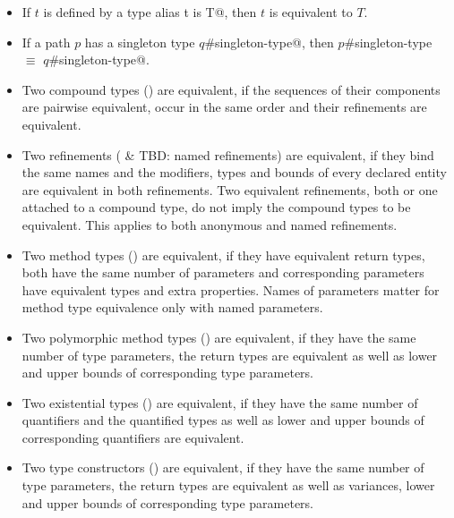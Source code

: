\begin{itemize}
\item
If $t$ is defined by a type alias \lstinline@type t is T@, then $t$ is equivalent to $T$. 

\item
If a path $p$ has a singleton type \lstinline@$q$#singleton-type@, then \lstinline@$p$#singleton-type $\equiv$ $q$#singleton-type@. 

\item
Two compound types () are equivalent, if the sequences of their components are pairwise equivalent, occur in the same order and their refinements are equivalent.

\item 
Two refinements ( \& TBD: named refinements) are equivalent, if they bind the same names and the modifiers, types and bounds of every declared entity are equivalent in both refinements. Two equivalent refinements, both or one attached to a compound type, do not imply the compound types to be equivalent. This applies to both anonymous and named refinements. 

\item
Two method types () are equivalent, if they have equivalent return types, both have the same number of parameters and corresponding parameters have equivalent types and extra properties. Names of parameters matter for method type equivalence only with named parameters. 

\item
Two polymorphic method types () are equivalent, if they have the same number of type parameters, the return types are equivalent as well as lower and upper bounds of corresponding type parameters. 

\item
Two existential types () are equivalent, if they have the same number of quantifiers and the quantified types as well as lower and upper bounds of corresponding quantifiers are equivalent. 

\item
Two type constructors () are equivalent, if they have the same number of type parameters, the return types are equivalent as well as variances, lower and upper bounds of corresponding type parameters. 

\end{itemize}


